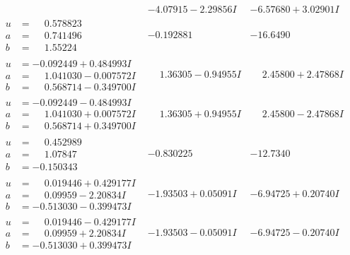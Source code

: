 \documentclass[1p]{elsarticle_modified}
\theoremstyle{definition}
\begin{document}
$$\begin{array}{c|c|c}
 & -4.07915 - 2.29856 I & -6.57680 + 3.02901 I \\ \hline\begin{aligned}
u &= \phantom{-}0.578823\phantom{ +0.000000I} \\
a &= \phantom{-}0.741496\phantom{ +0.000000I} \\
b &= \phantom{-}1.55224\phantom{ +0.000000I}\end{aligned}
 & -0.192881\phantom{ +0.000000I} & -16.6490\phantom{ +0.000000I} \\ \hline\begin{aligned}
u &= -0.092449 + 0.484993 I \\
a &= \phantom{-}1.041030 - 0.007572 I \\
b &= \phantom{-}0.568714 - 0.349700 I\end{aligned}
 & \phantom{-}1.36305 - 0.94955 I & \phantom{-}2.45800 + 2.47868 I \\ \hline\begin{aligned}
u &= -0.092449 - 0.484993 I \\
a &= \phantom{-}1.041030 + 0.007572 I \\
b &= \phantom{-}0.568714 + 0.349700 I\end{aligned}
 & \phantom{-}1.36305 + 0.94955 I & \phantom{-}2.45800 - 2.47868 I \\ \hline\begin{aligned}
u &= \phantom{-}0.452989\phantom{ +0.000000I} \\
a &= \phantom{-}1.07847\phantom{ +0.000000I} \\
b &= -0.150343\phantom{ +0.000000I}\end{aligned}
 & -0.830225\phantom{ +0.000000I} & -12.7340\phantom{ +0.000000I} \\ \hline\begin{aligned}
u &= \phantom{-}0.019446 + 0.429177 I \\
a &= \phantom{-}0.09959 - 2.20834 I \\
b &= -0.513030 - 0.399473 I\end{aligned}
 & -1.93503 + 0.05091 I & -6.94725 + 0.20740 I \\ \hline\begin{aligned}
u &= \phantom{-}0.019446 - 0.429177 I \\
a &= \phantom{-}0.09959 + 2.20834 I \\
b &= -0.513030 + 0.399473 I\end{aligned}
 & -1.93503 - 0.05091 I & -6.94725 - 0.20740 I \\ \hline\begin{aligned}

\end{aligned}
\end{array}$$
\end{document}
